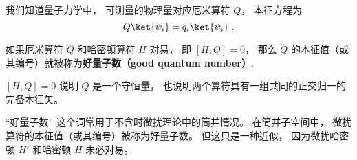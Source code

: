 
\begin{issues}
\issueDraft
{}
\end{issues}


我们知道量子力学中， 可测量的物理量对应厄米算符 $Q$， 本征方程为
\begin{equation}\label{eq_GoodQN_1}
Q \ket{\psi_i} = q_i \ket{\psi_i}~.
\end{equation}

\begin{definition}{}
如果厄米算符 $Q$ 和哈密顿算符 $H$ 对易， 即 $[H, Q] = 0$， 那么 $Q$ 的本征值（或其编号）就被称为\textbf{好量子数（good quantum number）}.
\end{definition}

$[H, Q] = 0$ 说明 $Q$ 是一个守恒量， 也说明两个算符具有一组共同的正交归一的完备本征矢。

“好量子数” 这个词常用于不含时微扰理论中的简并情况。 在简并子空间中， 微扰算符的本征值（或其编号）被称为好量子数。 但这只是一种近似， 因为微扰哈密顿 $H'$ 和哈密顿 $H$ 未必对易。
